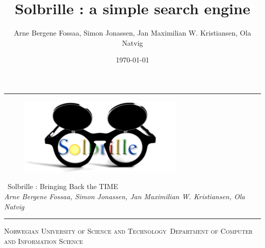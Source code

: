 \title{Solbrille : a simple search engine}
\author{Arne Bergene Fossaa, Simon Jonassen, Jan Maximilian W. Kristiansen, Ola Natvig}
\date{\today}

\newcommand{\HRule}{\rule{\linewidth}{1mm}}

\noindent\HRule
\begin{center}
  \begin{figure}[htbp]
  \begin{center}
  \includegraphics[width=0.7\textwidth]{../web/img/logo.png}
  \end{center}
  \end{figure}
  \huge
  \noindent \ Solbrille : Bringing Back the TIME \\ [7mm] \large
  \noindent \emph{Arne Bergene Fossaa, Simon Jonassen, Jan Maximilian W. Kristiansen, Ola Natvig}
\end{center}
\noindent\HRule
{}
\begin{center}
\Large\textsc{Norwegian University of Science and Technology}\
\Large\textsc{Department of Computer and Information Science}\
\end{center}
